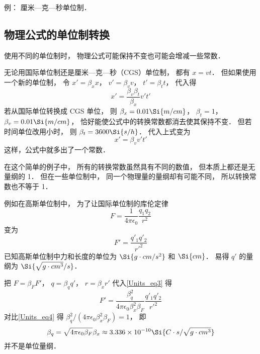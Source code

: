 例： 厘米—克—秒单位制．

\subsection{物理公式的单位制转换}
使用不同的单位制时， 物理公式可能保持不变也可能会增减一些常数．

\begin{example}{}
无论用国际单位制还是厘米—克—秒（CGS）单位制， 都有 $x = vt$． 但如果使用一个新的单位制， 令 $x' = \beta_x x$， $v' = \beta_v v$， $t' = \beta_t t$， 代入得
\begin{equation}
x' = \frac{\beta_v\beta_t}{\beta_x} v' t'
\end{equation}
若从国际单位转换成 CGS 单位， 则 $\beta_x = 0.01 \Si{m/cm}$， $\beta_t = 1$， $\beta_v = 0.01 \Si{m/cm}$， 恰好能使公式中的转换常数都消去使其保持不变． 但若时间单位改用小时， 则 $\beta_t = 3600 \Si{s/h}$． 代入上式变为
\begin{equation}
x' = \beta_v v' t'
\end{equation}
这样，公式中就多出了一个常数．
\end{example}
在这个简单的例子中， 所有的转换常数虽然具有不同的数值， 但本质上都还是无量纲的 1． 但在一些单位制中， 同一个物理量的量纲却有可能不同， 所以转换常数也不等于 1．
\begin{example}{}
例如在高斯单位制中， 为了让国际单位制的库伦定律
\begin{equation}\label{Units_eq3}
F = \frac{1}{4\pi\epsilon_0}\frac{q_1 q_2}{r^2}
\end{equation}
变为
\begin{equation}\label{Units_eq4}
F' = \frac{q'_1 q'_2}{r'^2}
\end{equation}
已知高斯单位制中力和长度的单位为 $\Si{g\cdot cm/s^2}$ 和 $\Si{cm}$． 易得 $q'$ 的量纲为 $\Si{\sqrt{g\cdot cm^3}/s}$．

把 $F = \beta_F F'$， $q = \beta_q q'$， $r = \beta_x r'$ 代入\autoref{Units_eq3} 得
\begin{equation}
F' =  \frac{\beta_q^2}{4\pi\epsilon_0\beta_x^2 \beta_F}\frac{q'_1 q'_2}{r'^2}
\end{equation}
对比\autoref{Units_eq4} 得 $\beta_q^2/(4\pi\epsilon_0\beta_x^2 \beta_F) = 1$， 即
\begin{equation}
\beta_q = \sqrt{4\pi\epsilon_0 \beta_F} \beta_x \approx 3.336\times 10^{-10} \Si{C\cdot s/\sqrt{g\cdot cm^3}}
\end{equation}
并不是单位量纲．
\end{example}

